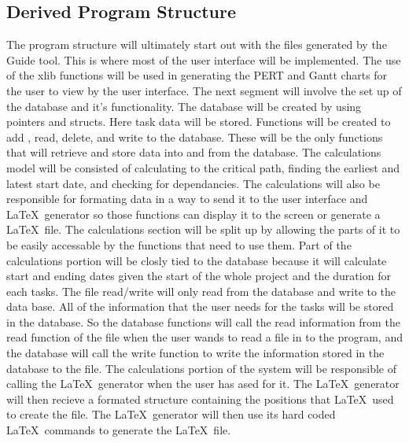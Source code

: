         \subsection{Derived Program Structure}
        The program structure will ultimately start out with the files
generated by the Guide tool. This is where most of the user interface will
be implemented. The use of the xlib functions will be used in generating
the PERT and Gantt charts for the user to view by the user interface. The
next segment will involve the set up of the database and it's
functionality. The database will be created by using pointers and structs.
Here task data will be stored. Functions will be created to add
, read, delete, and write to the database. These will be the only
functions that will retrieve and store data into and from the database. The
calculations model will be consisted of calculating to the  critical path,
finding the earliest and latest start date, and checking for dependancies.
The calculations will also be responsible for formating data in a way to
send it to the user interface and \LaTeX\ generator so those functions can
display it to the screen or generate a \LaTeX\ file. The calculations
section will be split up by allowing the parts of it to be easily
accessable by the functions that need to use them. Part of the calculations
portion will be closly tied to the database because it will calculate start
and ending dates given the start of the whole project and the duration for
each tasks. The file read/write will only read from the database and write
to the data base. All of the information that the user needs for the tasks
will be stored in the database. So the database functions will call the
read information from the read function of the file when the user wands to
read a file in to the program, and the database will call the write
function to write the information stored in the database to the file.
The calculations portion of the system will be responsible of calling the
\LaTeX\ generator when the user has ased for it. The \LaTeX\ generator will
then recieve a formated structure containing the positions that \LaTeX\ used
to create the file. The \LaTeX\ generator will then use its hard coded \LaTeX\
commands to generate the \LaTeX\ file.


